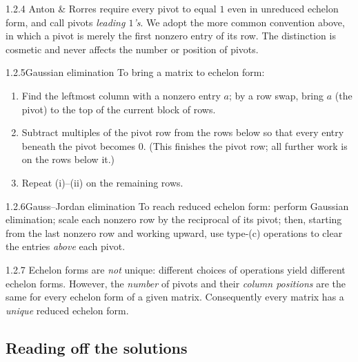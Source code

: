 \begin{rmks}{1.2.4}
Anton \& Rorres require every pivot to equal $1$ even in unreduced echelon form, and call pivots \emph{leading $1$'s}. We adopt the more common convention above, in which a pivot is merely the first nonzero entry of its row. The distinction is cosmetic and never affects the number or position of pivots.
\end{rmks}

\begin{algs}{1.2.5}{Gaussian elimination}
To bring a matrix to echelon form:
\begin{enumerate}[label=\textup{(\roman*)},leftmargin=2.4em,itemsep=1pt]
\item Find the leftmost column with a nonzero entry $a$; by a row swap, bring $a$ (the pivot) to the top of the current block of rows.
\item Subtract multiples of the pivot row from the rows below so that every entry beneath the pivot becomes $0$. (This finishes the pivot row; all further work is on the rows below it.)
\item Repeat (i)--(ii) on the remaining rows.
\end{enumerate}
\end{algs}

\begin{algs}{1.2.6}{Gauss--Jordan elimination}
To reach reduced echelon form: perform Gaussian elimination; scale each nonzero row by the reciprocal of its pivot; then, starting from the last nonzero row and working upward, use type-(c) operations to clear the entries \emph{above} each pivot.
\end{algs}

\begin{rmks}{1.2.7}
Echelon forms are \emph{not} unique: different choices of operations yield different echelon forms. However, the \emph{number} of pivots and their \emph{column positions} are the same for every echelon form of a given matrix. Consequently every matrix has a \emph{unique} reduced echelon form.
\end{rmks}

\subsection{Reading off the solutions}

